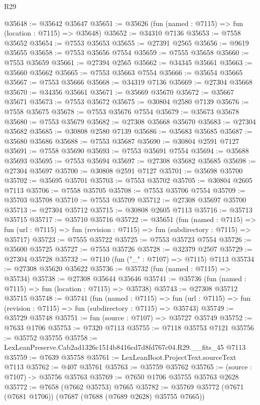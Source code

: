 \begin{lexlean}{R29}
\begin{coremodule}
@35648 := @35642 @35647
@35651 := @35626 (fun (named : @7115) => fun (location : @7115) => @35648)
@35652 := @34310 @7136
@35653 := @7558 @35652
@35654 := @7553 @35653
@35655 := @27391 @2565
@35656 := @9619 @35655
@35658 := @7553 @35656 @7554
@35659 := @7555 @35658
@35660 := @7553 @35659
@35661 := @27394 @2565
@35662 := @34345 @35661
@35663 := @35660 @35662
@35665 := @7553 @35663 @7554
@35666 := @35654 @35665
@35667 := @7553 @35666
@35668 := @34319 @7136
@35669 := @27304 @35668
@35670 := @34356 @35661
@35671 := @35669 @35670
@35672 := @35667 @35671
@35673 := @7553 @35672
@35675 := @30804 @2580 @7139
@35676 := @7558 @35675
@35678 := @7553 @35676 @7554
@35679 := @35673 @35678
@35680 := @7553 @35679
@35682 := @27308 @35668 @35670
@35683 := @27304 @35682
@35685 := @30808 @2580 @7139
@35686 := @35683 @35685
@35687 := @35680 @35686
@35688 := @7553 @35687
@35690 := @30804 @2591 @7127
@35691 := @7558 @35690
@35693 := @7553 @35691 @7554
@35694 := @35688 @35693
@35695 := @7553 @35694
@35697 := @27308 @35682 @35685
@35698 := @27304 @35697
@35700 := @30808 @2591 @7127
@35701 := @35698 @35700
@35702 := @35695 @35701
@35703 := @7553 @35702
@35705 := @30804 @2605 @7113
@35706 := @7558 @35705
@35708 := @7553 @35706 @7554
@35709 := @35703 @35708
@35710 := @7553 @35709
@35712 := @27308 @35697 @35700
@35713 := @27304 @35712
@35715 := @30808 @2605 @7113
@35716 := @35713 @35715
@35717 := @35710 @35716
@35722 := @35651
    (fun (named : @7115) =>
    fun (url : @7115) => fun (revision : @7115) => fun (subdirectory : @7115) => @35717)
@35723 := @7555 @35722
@35725 := @7553 @35723 @7554
@35726 := @35600 @35725
@35727 := @7553 @35726
@35728 := @32379 @2507
@35729 := @27304 @35728
@35732 := @7110 (fun ("_" : @7107) => @7115) @7113
@35734 := @27308 @35620 @35622
@35736 := @35732 (fun (named : @7115) => @35734)
@35738 := @27308 @35644 @35646
@35741 := @35736 (fun (named : @7115) => fun (location : @7115) => @35738)
@35743 := @27308 @35712 @35715
@35748 := @35741
    (fun (named : @7115) =>
    fun (url : @7115) => fun (revision : @7115) => fun (subdirectory : @7115) => @35743)
@35749 := @35729 @35748
@35751 := fun (source : @7107) => @35727 @35749
@35752 := @7633 @1706
@35753 := @7320 @7113
@35755 := @7118 @35753 @7121
@35756 := @35752 @35755
@35758 := LexLeanPreserve.Cab2ad1326c1514b8416cd7d8fd767c04.R29.__fits_45 @7113
@35759 := @7639 @35758
@35761 := LexLeanBoot.ProjectText.sourceText @7113
@35762 := @407 @35761
@35763 := @35759 @35762
@35765 := (source : @7107) -> @35756 @35763
@35769 := @7650 @1706 @35755 @35763 @2628
@35772 := @7658 (@7662 @35753) @7665
@35782 := @35769 @35772 (@7671 (@7681 @1706)) (@7687 (@7688 (@7689 @2628) @35755 @7665))

\end{coremodule}
\end{lexlean}
